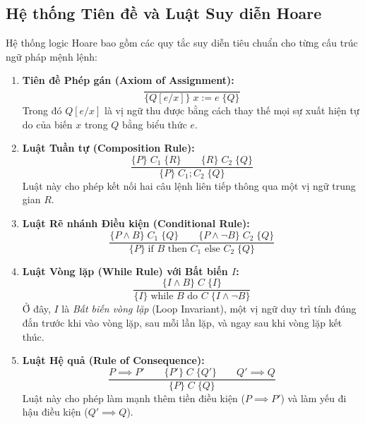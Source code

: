 \subsection{Hệ thống Tiên đề và Luật Suy diễn Hoare}
Hệ thống logic Hoare bao gồm các quy tắc suy diễn tiêu chuẩn cho từng cấu trúc ngữ pháp mệnh lệnh:

\begin{enumerate}
    \item \textbf{Tiên đề Phép gán (Axiom of Assignment):}
    \begin{equation}
    \frac{}{\{Q[e / x]\} \; x := e \; \{Q\}}
    \end{equation}
    Trong đó $Q[e / x]$ là vị ngữ thu được bằng cách thay thế mọi sự xuất hiện tự do của biến $x$ trong $Q$ bằng biểu thức $e$.

    \item \textbf{Luật Tuần tự (Composition Rule):}
    \begin{equation}
    \frac{\{P\} \; C_1 \; \{R\} \quad\quad \{R\} \; C_2 \; \{Q\}}{\{P\} \; C_1 ; C_2 \; \{Q\}}
    \end{equation}
    Luật này cho phép kết nối hai câu lệnh liên tiếp thông qua một vị ngữ trung gian $R$.

    \item \textbf{Luật Rẽ nhánh Điều kiện (Conditional Rule):}
    \begin{equation}
    \frac{\{P \land B\} \; C_1 \; \{Q\} \quad\quad \{P \land \neg B\} \; C_2 \; \{Q\}}{\{P\} \; \text{if } B \text{ then } C_1 \text{ else } C_2 \; \{Q\}}
    \end{equation}

    \item \textbf{Luật Vòng lặp (While Rule) với Bất biến $I$:}
    \begin{equation}
    \frac{\{I \land B\} \; C \; \{I\}}{\{I\} \; \text{while } B \text{ do } C \; \{I \land \neg B\}}
    \end{equation}
    Ở đây, $I$ là \textit{Bất biến vòng lặp} (Loop Invariant), một vị ngữ duy trì tính đúng đắn trước khi vào vòng lặp, sau mỗi lần lặp, và ngay sau khi vòng lặp kết thúc.

    \item \textbf{Luật Hệ quả (Rule of Consequence):}
    \begin{equation}
    \frac{P \implies P' \quad\quad \{P'\} \; C \; \{Q'\} \quad\quad Q' \implies Q}{\{P\} \; C \; \{Q\}}
    \end{equation}
    Luật này cho phép làm mạnh thêm tiền điều kiện ($P \implies P'$) và làm yếu đi hậu điều kiện ($Q' \implies Q$).
\end{enumerate}



